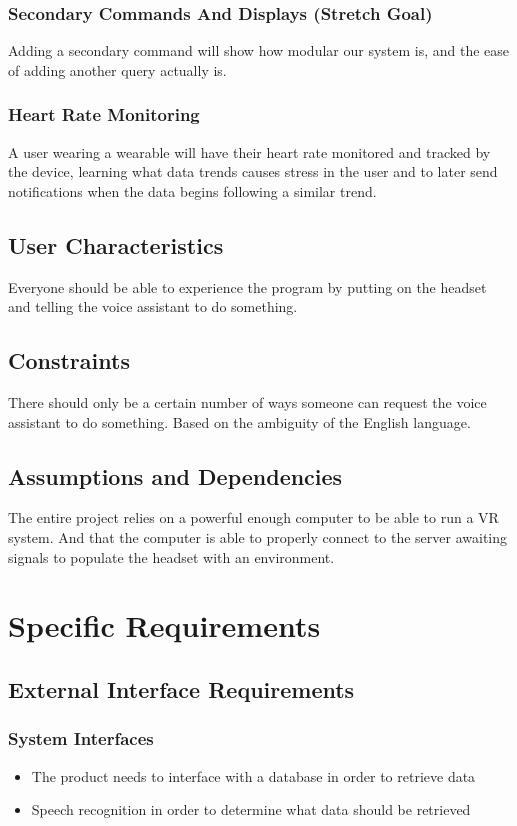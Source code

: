 \documentclass[onecolumn, draftclsnofoot,10pt, compsoc]{IEEEtran}
\begin{document}
        \subsubsection{Secondary Commands And Displays (Stretch Goal)}
            Adding a secondary command will show how modular our system is, and the ease of adding another query actually is.

        \subsubsection{Heart Rate Monitoring}
            A user wearing a wearable will have their heart rate monitored and tracked by the device, learning what data trends causes stress in the user and to later send notifications when the data begins following a similar trend.

    \subsection{User Characteristics}
        Everyone should be able to experience the program by putting on the headset and telling the voice assistant to do something.

    \subsection{Constraints}
        There should only be a certain number of ways someone can request the voice assistant to do something. Based on the ambiguity of the English language.

    \subsection{Assumptions and Dependencies}
        The entire project relies on a powerful enough computer to be able to run a VR system. And that the computer is able to properly connect to the server awaiting signals to populate the headset with an environment.

\section{Specific Requirements}
    \subsection{External Interface Requirements}
        \subsubsection{System Interfaces}
            \begin{itemize}
                \item The product needs to interface with a database in order to retrieve data
                \item Speech recognition in order to determine what data should be retrieved
            \end{itemize}
\end{document}
